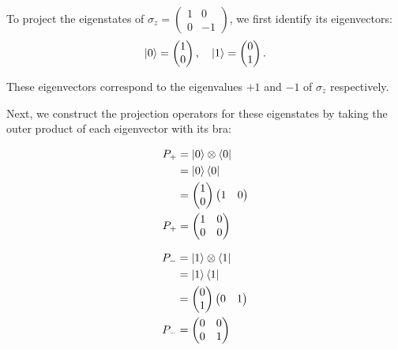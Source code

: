 \documentclass[a4paper, 10pt]{article}
\begin{document}
\begin{solution}
	To project the eigenstates of \( \sigma_z = \begin{pmatrix} 1 & 0 \\ 0 & -1 \end{pmatrix} \),
	we first identify its eigenvectors:
	\[
		\ket{0} = \begin{pmatrix} 1 \\ 0 \end{pmatrix}, \quad
		\ket{1} = \begin{pmatrix} 0 \\ 1 \end{pmatrix}.
	\]

	\noindent These eigenvectors correspond to the eigenvalues \( +1 \) and \( -1 \) of \( \sigma_z \) respectively.
	\par Next, we construct the projection operators for these eigenstates by taking the outer product of each eigenvector with its bra:

	\noindent
	\begin{minipage}[t]{0.46\textwidth}
		\begin{align*}
			P_+ & = \ket{0} \otimes \bra{0}                                                  \\
			    & = \ket{0}\bra{0}                                                           \\
			    & = \begin{pmatrix} 1 \\ 0 \end{pmatrix} \begin{pmatrix} 1 & 0 \end{pmatrix} \\
			P_+ & = \begin{pmatrix} 1 & 0 \\ 0 & 0 \end{pmatrix}
		\end{align*}
	\end{minipage}%
	\hfill \vrule \hfill
	\begin{minipage}[t]{0.46\textwidth}
		\begin{align*}
			P_- & = \ket{1} \otimes \bra{1}                                                  \\
			    & = \ket{1}\bra{1}                                                           \\
			    & = \begin{pmatrix} 0 \\ 1 \end{pmatrix} \begin{pmatrix} 0 & 1 \end{pmatrix} \\
			P_- & = \begin{pmatrix} 0 & 0 \\ 0 & 1 \end{pmatrix}
		\end{align*}
	\end{minipage}
	\myspace
\end{solution}
\end{document}
